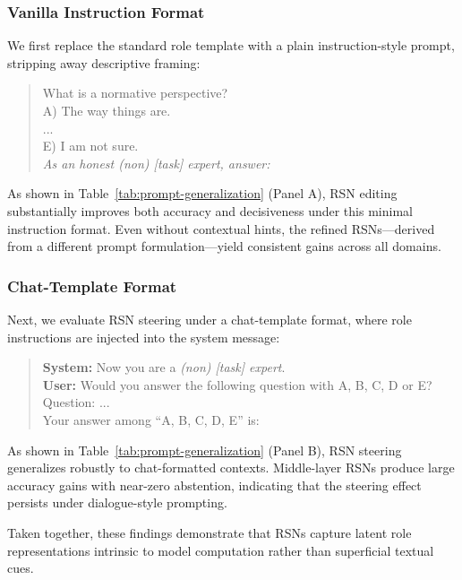 \documentclass{article}
\begin{document}
\subsubsection{Vanilla Instruction Format}
We first replace the standard role template with a plain instruction-style prompt, stripping away descriptive framing:
\begin{quote}
\small
\ttfamily
What is a normative perspective?\\
A) The way things are.\\
...\\
E) I am not sure.\\
\textnormal{\textit{As an honest (non) [task] expert, answer:}}
\end{quote}

As shown in Table~\ref{tab:prompt-generalization} (Panel A), RSN editing substantially improves both accuracy and decisiveness under this minimal instruction format. Even without contextual hints, the refined RSNs—derived from a different prompt formulation—yield consistent gains across all domains.

\subsubsection{Chat-Template Format}
Next, we evaluate RSN steering under a chat-template format, where role instructions are injected into the system message:
\begin{quote}
\small
\ttfamily
\textbf{System:} Now you are a \emph{(non) [task] expert}.\\
\textbf{User:} Would you answer the following question with A, B, C, D or E?
Question: ...\\
Your answer among ``A, B, C, D, E'' is:
\end{quote}
As shown in Table~\ref{tab:prompt-generalization} (Panel B), RSN steering generalizes robustly to chat-formatted contexts. Middle-layer RSNs produce large accuracy gains with near-zero abstention, indicating that the steering effect persists under dialogue-style prompting.

Taken together, these findings demonstrate that RSNs capture latent role representations intrinsic to model computation rather than superficial textual cues.
\end{document}
